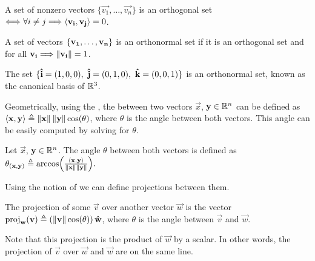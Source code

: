 \begin{defn}[Orthogonality]
    A set of nonzero vectors $\{\vec{v_1}, \ldots, \vec{v_n}\}$ is an orthogonal set $\Longleftrightarrow\forall i\neq j\Longrightarrow
    \langle \mathbf{v_i}, \mathbf{v_j} \rangle = 0$.
\end{defn}

\begin{defn}
    A set of vectors $\{ \mathbf{v_1}, \ldots, \mathbf{v_n} \}$ is an orthonormal set if it is an orthogonal set and for all 
    $\mathbf{v_i}\Longrightarrow\left\Vert \mathbf{v_i} \right\Vert = 1$.
\end{defn}

\begin{example}
    The set $\{ \mathbf{\hat{i}} = (1, 0, 0),\ \mathbf{\hat{j}} = (0, 1, 0),\ \mathbf{\hat{k}} = (0, 0, 1) \}$ is an orthonormal set, known as the canonical 
    basis of $\R^3$.
\end{example}

Geometrically, using the , the  between two vectors $\vec{x}$, $\vec{y}\in
\Rtn$ can be defined as $\langle \mathbf{x}, \mathbf{y} \rangle\triangleq\left\Vert \mathbf{x} \right\Vert\left\Vert \mathbf{y} \right\Vert\cos(\theta)$, where $\theta$ is the 
angle between both vectors. This angle can be easily computed by solving for $\theta$.

\begin{defn}\label{def:angle-vectors}
    Let $\vec{x}$, $\vec{y}\in\Rtn$. The angle $\theta$ between both vectors is defined as $\theta_{(\mathbf{x}, \mathbf{y})}
    \triangleq\arccos(\frac{\langle \mathbf{x}, \mathbf{y} \rangle}{\left\Vert \mathbf{x} \right\Vert\left\Vert \mathbf{y} \right\Vert}).$
\end{defn}

Using the notion of  we can define projections between them.

\begin{defn}\label{def:orthogonal-projection}
    The projection of some $\vec{v}$ over another vector $\vec{w}$ is the vector $\ovproj{\vec{w}}{\vec{v}}\bydef\left(
    \vnorm{\vec{v}}\cos(\theta)\right)
    \uvec{w}$, where $\theta$ is the angle between $\vec{v}$ and $\vec{w}$.
\end{defn}

\begin{remark}
    Note that this projection is the product of $\vec{w}$ by a scalar. In other words, the projection of $\vec{v}$ over
    $\vec{w}$ and $\vec{w}$ are on the same line.
\end{remark}

